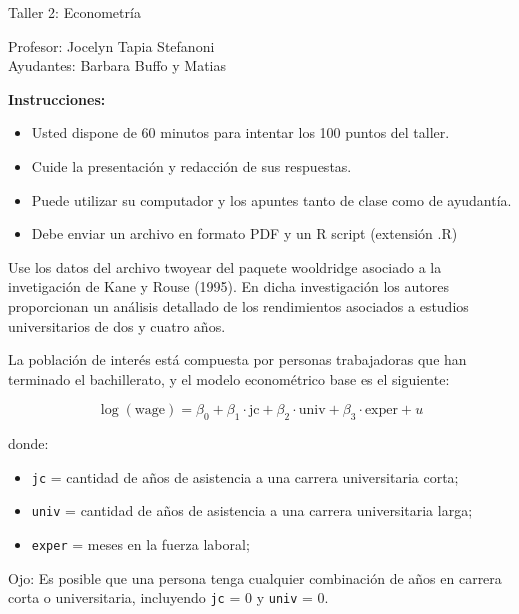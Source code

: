\documentclass[letterpaper,11pt]{article}
\begin{document}
\begin{center}
    {\Large  Taller 2: Econometría }

Profesor:    Jocelyn Tapia Stefanoni\\
Ayudantes:     Barbara Buffo y Matias 
\end{center}

\textbf{Instrucciones:} 

\begin{itemize}
    \item Usted dispone de 60 minutos  para intentar los 100 puntos del taller.
    \item Cuide la presentación y redacción de sus respuestas.
    \item Puede utilizar su computador y los apuntes tanto de clase como de ayudantía.
    \item Debe enviar un archivo en formato PDF y un R script (extensión .R)
\end{itemize}


Use los datos del archivo twoyear del paquete wooldridge  asociado a la invetigaci\'on de Kane y Rouse (1995). En dicha investigación los autores proporcionan un análisis detallado de los rendimientos asociados a estudios universitarios de dos y cuatro años.

La población de interés está compuesta por personas trabajadoras que han terminado el bachillerato, y el modelo econométrico base es el siguiente:

\begin{equation}
\log(\text{wage}) = \beta_0 + \beta_1 \cdot \text{jc} + \beta_2 \cdot \text{univ} + \beta_3 \cdot \text{exper} + u
\label{eq:4.17}
\end{equation}

donde:

\begin{itemize}
    \item \texttt{jc} = cantidad de años de asistencia a una carrera universitaria corta;
    \item \texttt{univ} = cantidad de años de asistencia a una carrera universitaria larga;
    \item \texttt{exper} = meses en la fuerza laboral;
\end{itemize}

Ojo: Es posible que una persona tenga cualquier combinación de años en carrera corta o universitaria, incluyendo \texttt{jc} = 0 y \texttt{univ} = 0.
\end{document}
